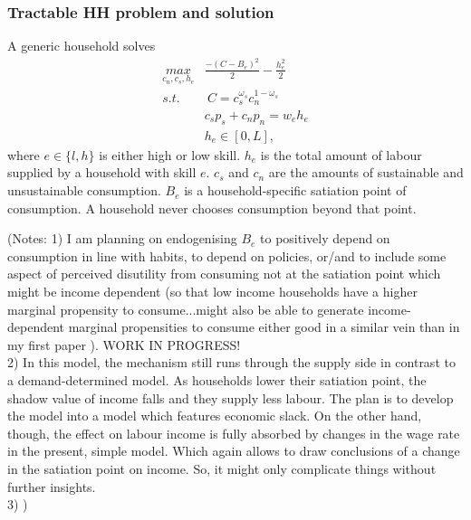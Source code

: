 \subsubsection{Tractable HH problem and solution}
A generic household solves
\begin{align*}
\underset{c_n, c_s, h_e}{max}& \frac{-(C-B_e)^2}{2}- \frac{h_e^2}{2}\\
s.t.& \ C= c_s^{\omega_s} c_n^{1-\omega_s}\\
& c_sp_s+c_np_n=w_e h_e\\ %
& h_e\in[0,L],
\end{align*}
where $e\in\{l,h\}$ is either high or low skill. $h_e$  is the total amount of labour supplied by a household with skill $e$. $c_s$ and $c_n$ are the amounts of sustainable and unsustainable consumption.  $B_e$ is a household-specific satiation point of consumption. A household never chooses consumption beyond that point.

(Notes: 
1) I am planning on endogenising $B_e$ to positively depend on consumption in line with habits, to depend on policies, or/and to include some aspect of perceived disutility from consuming not at the satiation point which might be income dependent (so that low income households have a higher marginal propensity to consume...might also be able to generate income-dependent marginal propensities to consume either good in a similar vein than in my first paper ). WORK IN PROGRESS! \\
2) In this model, the mechanism still runs through the supply side in contrast to a demand-determined model. As households lower their satiation point, the shadow value of income falls and they supply less labour. The plan is to develop the model into a model which features economic slack. On the other hand, though, the effect on labour income is fully absorbed by changes in the wage rate in the present, simple model. Which again allows to draw conclusions of a change in the satiation point on income. So, it might only complicate things without further insights.\\
3) )
\begin{comment}
(\textit{Note: Could allow high-skill workers to choose where to work BUT then same wage rate!})

content...
\end{comment}


